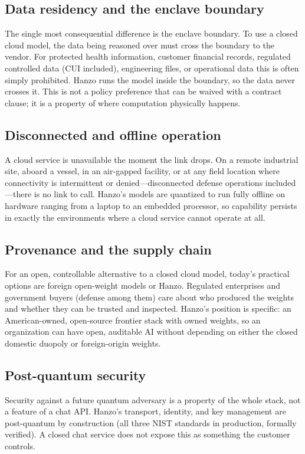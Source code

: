 \documentclass[11pt,letterpaper]{article}
\begin{document}
\subsection{Data residency and the enclave boundary}
The single most consequential difference is the enclave boundary. To use a closed
cloud model, the data being reasoned over must cross the boundary to the vendor.
For protected health information, customer financial records, regulated
controlled data (CUI included), engineering files, or operational data this is often
simply prohibited. Hanzo runs the model inside the boundary, so the data never
crosses it. This is not a policy preference that can be waived with a contract
clause; it is a property of where computation physically happens.

\subsection{Disconnected and offline operation}
A cloud service is unavailable the moment the link drops. On a remote industrial
site, aboard a vessel, in an air-gapped facility, or at any field location where
connectivity is intermittent or denied---disconnected defense operations
included---there is no link to call.
Hanzo's models are quantized to run fully offline on hardware ranging from a
laptop to an embedded processor, so capability persists in exactly the
environments where a cloud service cannot operate at all.

\subsection{Provenance and the supply chain}
For an open, controllable alternative to a closed cloud model, today's practical
options are foreign open-weight models or Hanzo. Regulated enterprises and
government buyers (defense among them) care about who
produced the weights and whether they can be trusted and inspected. Hanzo's
position is specific: an American-owned, open-source frontier stack with owned
weights, so an organization can have open, auditable AI without depending on
either the closed domestic duopoly or foreign-origin weights.

\subsection{Post-quantum security}
Security against a future quantum adversary is a property of the whole stack, not
a feature of a chat API. Hanzo's transport, identity, and key management are
post-quantum by construction (all three NIST standards in production, formally
verified). A closed chat service does not expose this as something the customer
controls.
\end{document}
